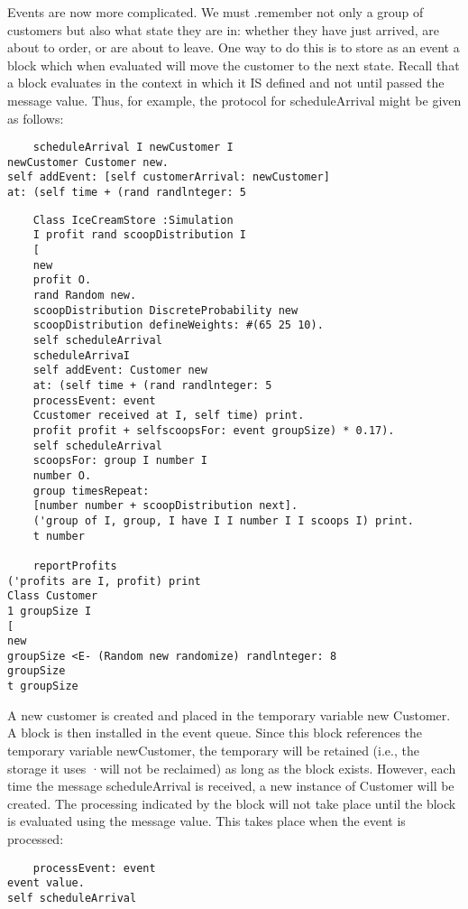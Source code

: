 Events are now more complicated. We must .remember not only a group of customers
but also what state they are in: whether they have just arrived, are about to
order, or are about to leave. One way to do this is to store as an event a block
which when evaluated will move the customer to the next state. Recall that a
block evaluates in the context in which it IS defined and not until passed the
message value. Thus, for example, the protocol for scheduleArrival might be
given as follows:
\begin{lstlisting}
    scheduleArrival I newCustomer I
newCustomer Customer new.
self addEvent: [self customerArrival: newCustomer]
at: (self time + (rand randlnteger: 5
\end{lstlisting}

\begin{lstlisting}
    Class IceCreamStore :Simulation
    I profit rand scoopDistribution I
    [
    new
    profit O.
    rand Random new.
    scoopDistribution DiscreteProbability new
    scoopDistribution defineWeights: #(65 25 10).
    self scheduleArrival
    scheduleArrivaI
    self addEvent: Customer new
    at: (self time + (rand randlnteger: 5
    processEvent: event
    Ccustomer received at I, self time) print.
    profit profit + selfscoopsFor: event groupSize) * 0.17).
    self scheduleArrival
    scoopsFor: group I number I
    number O.
    group timesRepeat:
    [number number + scoopDistribution next].
    ('group of I, group, I have I I number I I scoops I) print.
    t number
    
    reportProfits
('profits are I, profit) print
Class Customer
1 groupSize I
[
new
groupSize <E- (Random new randomize) randlnteger: 8
groupSize
t groupSize
\end{lstlisting}

A new customer is created and placed in the temporary variable new Customer. A
block is then installed in the event queue. Since this block references the
temporary variable newCustomer, the temporary will be retained (i.e., the
storage it uses ·will not be reclaimed) as long as the block exists. However,
each time the message scheduleArrival is received, a new instance of Customer
will be created. The processing indicated by the block will not take place until
the block is evaluated using the message value. This takes place when the event
is processed:
\begin{lstlisting}
    processEvent: event
event value.
self scheduleArrival
\end{lstlisting}

